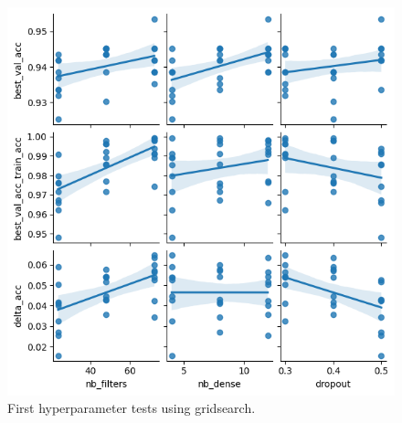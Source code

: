\begin{figure}[H]
    \centering
    \includegraphics[width=.8\textwidth]{plots/FirstHyperparameterTests.png}
    \caption{First hyperparameter tests using gridsearch.}
    \label{fig:FirstHyperparameterTests}
\end{figure}


% 